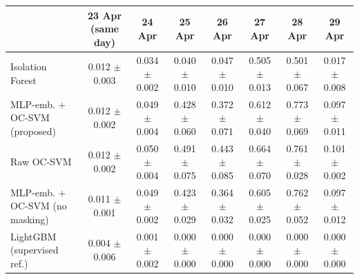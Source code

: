 \begin{tabular}{lccccccc}
\toprule
 & 23 Apr (same day) & 24 Apr & 25 Apr & 26 Apr & 27 Apr & 28 Apr & 29 Apr \\
\midrule
Isolation Forest & 0.012 $\pm$ 0.003 & 0.034 $\pm$ 0.002 & 0.040 $\pm$ 0.010 & 0.047 $\pm$ 0.010 & 0.505 $\pm$ 0.013 & 0.501 $\pm$ 0.067 & 0.017 $\pm$ 0.008 \\
MLP-emb. + OC-SVM (proposed) & 0.012 $\pm$ 0.002 & 0.049 $\pm$ 0.004 & 0.428 $\pm$ 0.060 & 0.372 $\pm$ 0.071 & 0.612 $\pm$ 0.040 & 0.773 $\pm$ 0.069 & 0.097 $\pm$ 0.011 \\
Raw OC-SVM & 0.012 $\pm$ 0.002 & 0.050 $\pm$ 0.004 & 0.491 $\pm$ 0.075 & 0.443 $\pm$ 0.085 & 0.664 $\pm$ 0.070 & 0.761 $\pm$ 0.028 & 0.101 $\pm$ 0.002 \\
MLP-emb. + OC-SVM (no masking) & 0.011 $\pm$ 0.001 & 0.049 $\pm$ 0.002 & 0.423 $\pm$ 0.029 & 0.364 $\pm$ 0.032 & 0.605 $\pm$ 0.025 & 0.762 $\pm$ 0.052 & 0.097 $\pm$ 0.012 \\
LightGBM (supervised ref.) & 0.004 $\pm$ 0.006 & 0.001 $\pm$ 0.002 & 0.000 $\pm$ 0.000 & 0.000 $\pm$ 0.000 & 0.000 $\pm$ 0.000 & 0.000 $\pm$ 0.000 & 0.000 $\pm$ 0.000 \\
\bottomrule
\end{tabular}